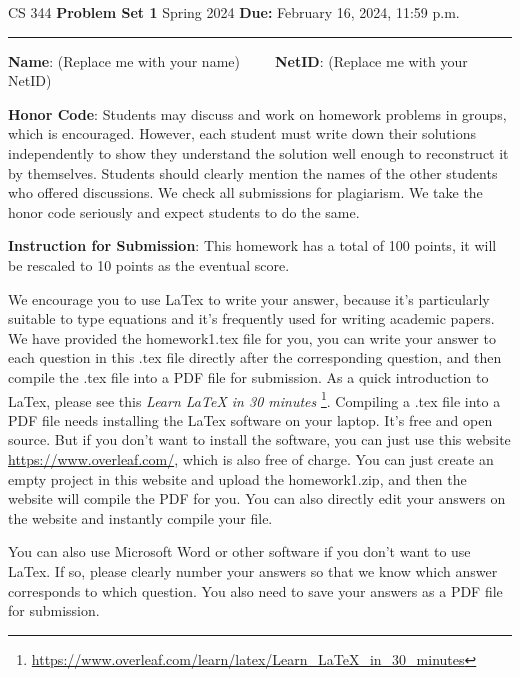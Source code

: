 \documentclass[12pt]{article}
\begin{document}
\noindent
CS 344 \hfill \textbf{Problem Set 1} \newline 
{Spring 2024} \hfill \textbf{Due:} February 16, 2024, 11:59 p.m.

\noindent
\rule{\linewidth}{0.4pt}

\vspace{.5cm}

\textbf{Name}: ({\color{blue}Replace me with your name})~~~~~\textbf{NetID}: ({\color{blue}Replace me with your NetID})

\vspace{.5cm}

\textbf{Honor Code}: Students may discuss and work on homework problems in groups, which is encouraged. However, each student must write down their solutions independently to show they understand the solution well enough to reconstruct it by themselves.  Students should clearly mention the names of the other students who offered discussions. We check all submissions for plagiarism. We take the honor code seriously and expect students to do the same. 


\vspace{.5cm}

\textbf{Instruction for Submission}: This homework has a total of 100 points, it will be rescaled to 10 points as the eventual score. 

We encourage you to use LaTex to write your answer, because it's particularly suitable to type equations and it's frequently used for writing academic papers. We have provided the homework1.tex file for you, you can write your answer to each question in this .tex file directly after the corresponding question, and then compile the .tex file into a PDF file for submission. As a quick introduction to LaTex, please see this \textit{Learn LaTeX in 30 minutes} \footnote{\url{https://www.overleaf.com/learn/latex/Learn_LaTeX_in_30_minutes}}. Compiling a .tex file into a PDF file needs installing the LaTex software on your laptop. It's free and open source. But if you don't want to install the software, you can just use this website \url{https://www.overleaf.com/}, which is also free of charge. You can just create an empty project in this website and upload the homework1.zip, and then the website will compile the PDF for you. You can also directly edit your answers on the website and instantly compile your file.

You can also use Microsoft Word or other software if you don't want to use LaTex. If so, please clearly number your answers so that we know which answer corresponds to which question. You also need to save your answers as a PDF file for submission.
\end{document}
